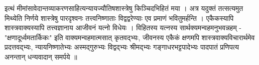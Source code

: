 {इत्थं मीमांसावेदान्तव्याकरणसाहित्यन्यायज्यौतिषशास्त्रेषु किञ्चिदभिहितं मया । अत्र यदुक्तं तत्सत्यमुत मिथ्येति निर्णये शास्त्रेषु पारदृश्वनः तत्त्वनिष्णाताः विद्वद्वरेण्याः एव प्रमाणं भवितुमर्हन्ति । एकैकस्यापि शास्त्रवाक्यस्यापि तत्त्वज्ञानाय आजीवनं यत्नो विधेयः । विहितस्य यत्नस्य सार्थक्यमन्वहमनुभवन्नहम् - "क्षणादूर्ध्वमतार्किकः" इति वाक्यमन्वहमात्मसात् कृतवद्भ्यः, जीवनस्य एकैकं क्षणमपि शास्त्रवाक्यविचारार्थमेव प्रदत्तवद्भ्यः, न्यायनिष्णातेभ्यः अस्मद्गुरुभ्यः विद्वद्भ्यः श्रीमद्भ्यः गङ्गाधरभट्टपादेभ्यः पादपातं प्रणिपत्य अनन्तान् धन्यवादान् समर्पये ॥
					
\articleend
}
